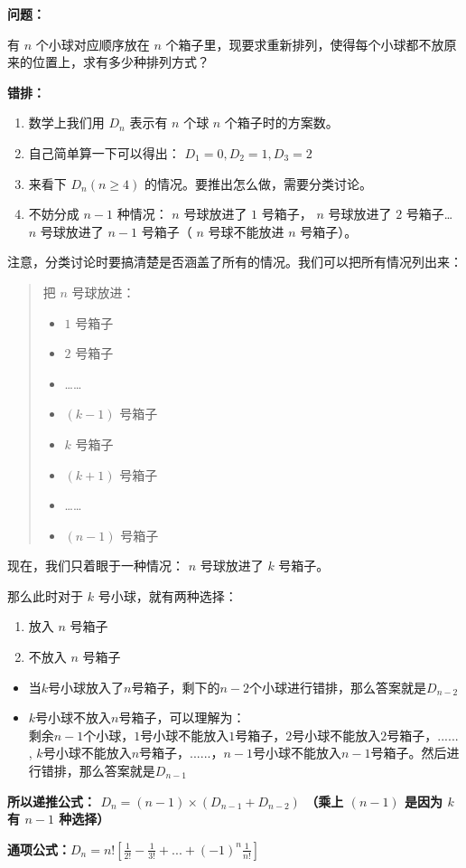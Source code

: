 \documentclass[E:/GsjzTle/main/main.tex]{subfiles}
\begin{document}
\textbf{问题：}

有 \(n\) 个小球对应顺序放在 \(n\)
个箱子里，现要求重新排列，使得每个小球都不放原来的位置上，求有多少种排列方式？

\textbf{错排：}

\begin{enumerate}
\def\labelenumi{\arabic{enumi}.}
\item
  数学上我们用 \(D_n\) 表示有 \(n\) 个球 \(n\) 个箱子时的方案数。
\item
  自己简单算一下可以得出： \(D_1=0,D_2=1,D_3=2\)
\item
  来看下 \(D_n(n\ge 4)\) 的情况。要推出怎么做，需要分类讨论。
\item
  不妨分成 \(n-1\) 种情况： \(n\) 号球放进了 \(1\) 号箱子， \(n\)
  号球放进了 \(2\) 号箱子\ldots{} \(n\) 号球放进了 \(n-1\) 号箱子（
  \(n\) 号球不能放进 \(n\) 号箱子）。
\end{enumerate}

注意，分类讨论时要搞清楚是否涵盖了所有的情况。我们可以把所有情况列出来：

\begin{quote}
把 \(n\) 号球放进：

\begin{itemize}
\item
  \(1\) 号箱子
\item
  \(2\) 号箱子
\item
  \ldots\ldots{}
\item
  \((k-1)\) 号箱子
\item
  \(k\) 号箱子
\item
  \((k+1)\) 号箱子
\item
  \ldots\ldots{}
\item
  \((n-1)\) 号箱子
\end{itemize}
\end{quote}

现在，我们只着眼于一种情况： \(n\) 号球放进了 \(k\) 号箱子。

那么此时对于 \(k\) 号小球，就有两种选择：

\begin{enumerate}
\def\labelenumi{\arabic{enumi}.}
\item
  放入 \(n\) 号箱子
\item
  不放入 \(n\) 号箱子
\end{enumerate}

\begin{itemize}
\item
  当\(k\)号小球放入了\(n\)号箱子，剩下的\(n-2\)个小球进行错排，那么答案就是\(D_{n-2}\)
\item
  \(k\)号小球不放入\(n\)号箱子，可以理解为：\\
  剩余\(n-1\)个小球，\(1\)号小球不能放入\(1\)号箱子，\(2\)号小球不能放入\(2\)号箱子，......
  ,
  \(k\)号小球不能放入\(n\)号箱子，......，\(n - 1\)号小球不能放入\(n-1\)号箱子。然后进行错排，那么答案就是\(D_{n-1}\)
\end{itemize}

\textbf{所以递推公式： \(D_{n} = (n - 1)\times(D_{n-1} + D_{n-2})\)
（乘上 \((n -1)\) 是因为 \(k\) 有 \(n-1\) 种选择）}

\textbf{通项公式：\(D_{n}=n!\left[{\frac {1}{2!}}-{\frac {1}{3!}}+...+(-1)^{n}{\frac {1}{n!}}\right]\)}
\end{document}

